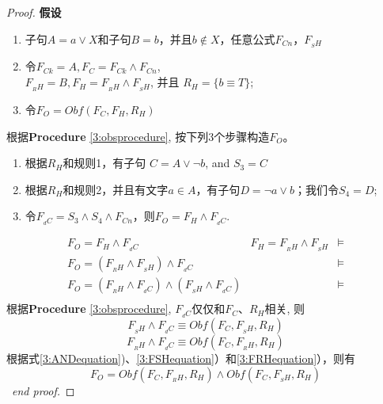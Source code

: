 \begin{proof}
 \textbf{假设}
 \begin{enumerate}
 \item[] 子句$A=a\vee X$和子句$B=b$，并且$b\notin X$，任意公式$F_{Cn}，F_{_SH}$
 \item[] 令$F_{Ck} =A, F_C=F_{Ck} \wedge F_{Cn}$, \\
           $F_{_RH}=B, F_H=F_{_RH}\wedge F_{_SH}$, 并且 $R_H=\{b\equiv T\}$;
 \item[] 令$F_O=Obf(F_C,F_H,R_H)$
 \end{enumerate}
 根据\textbf{Procedure} \ref{3:obsprocedure}, 按下列3个步骤构造$F_O$。
 \begin{enumerate}
 \item 根据$R_H$和规则1，有子句 $C=A\vee \neg b$, and $S_3=C$
 \item 根据$R_H$和规则2，并且有文字$a\in A$，有子句$D=\neg a\vee b$；我们令$S_4=D$;
 \item 令$F_{_dC} =S_3\wedge S_4 \wedge F_{Cn}$，则$F_O=F_H \wedge F_{_dC}$.
 \end{enumerate}
 \begin{equation}\label{3:ANDequation}
 \begin{array}{ccc}
 F_O  =  F_H \wedge F_{_dC}                                     & F_H=F_{_RH}\wedge F_{_SH}&\models\\
 F_O  =  (F_{_RH}\wedge F_{_SH})\wedge F_{_dC}                   &                        &\models\\
 F_O  =  (F_{_RH} \wedge F_{_dC})\wedge (F_{_SH} \wedge F_{_dC})  &                        &\models\\
 \end{array}
 \end{equation}
 根据\textbf{Procedure} \ref{3:obsprocedure}, $F_{_dC}$仅仅和$F_C$、$R_H$相关, 则
\begin{equation}\label{3:FSHequation}
 F_{_SH} \wedge F_{_dC} \equiv Obf(F_C,F_{_SH},R_H)
\end{equation}
\begin{equation}\label{3:FRHequation}
 F_{_RH} \wedge F_{_dC} \equiv Obf(F_C,F_{_RH},R_H)
\end{equation}
根据式\ref{3:ANDequation})、\ref{3:FSHequation}）和\ref{3:FRHequation}），则有
\begin{equation}
 F_O  = Obf(F_C,F_{_RH},R_H)\wedge Obf(F_C,F_{_SH},R_H)
\end{equation}
\
\textit{end proof.}
\end{proof}

